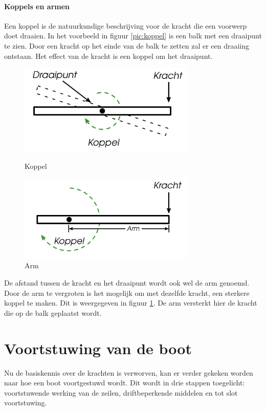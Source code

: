 \paragraph{Koppels en armen}
Een koppel is de natuurkundige beschrijving voor de kracht die een voorwerp doet draaien. In het voorbeeld in figuur \ref{pic:koppel} is een balk met een draaipunt te zien. Door een kracht op het einde van de balk te zetten zal er een draaiing ontstaan. Het effect van de kracht is een koppel om het draaipunt.

\begin{figure}[H]
	\centering
	\begin{minipage}[b]{0.49\textwidth}
		\centering
		\includegraphics[width=0.75\textwidth]{Hoofdstukken/Krachten/pdf/kracht_koppel.pdf}
		\caption{Koppel}
		\label{pic:koppel}
	\end{minipage}
	\hfill
	\begin{minipage}[b]{0.49\textwidth}
		\centering
		\includegraphics[width=0.75\textwidth]{Hoofdstukken/Krachten/pdf/kracht_arm.pdf}
		\caption{Arm}
		\label{pic:arm}
	\end{minipage}
\end{figure}
De afstand tussen de kracht en het draaipunt wordt ook wel de arm genoemd. Door de arm te vergroten is het mogelijk om met dezelfde kracht, een sterkere koppel te maken. Dit is weergegeven in figuur \ref{pic:arm}. De arm versterkt hier de kracht die op de balk geplaatst wordt.

\section{Voortstuwing van de boot}
Nu de basiskennis over de krachten is verworven, kan er verder gekeken worden naar hoe een boot voortgestuwd wordt. Dit wordt in drie stappen toegelicht: voortstuwende werking van de zeilen, driftbeperkende middelen en tot slot voortstuwing.

